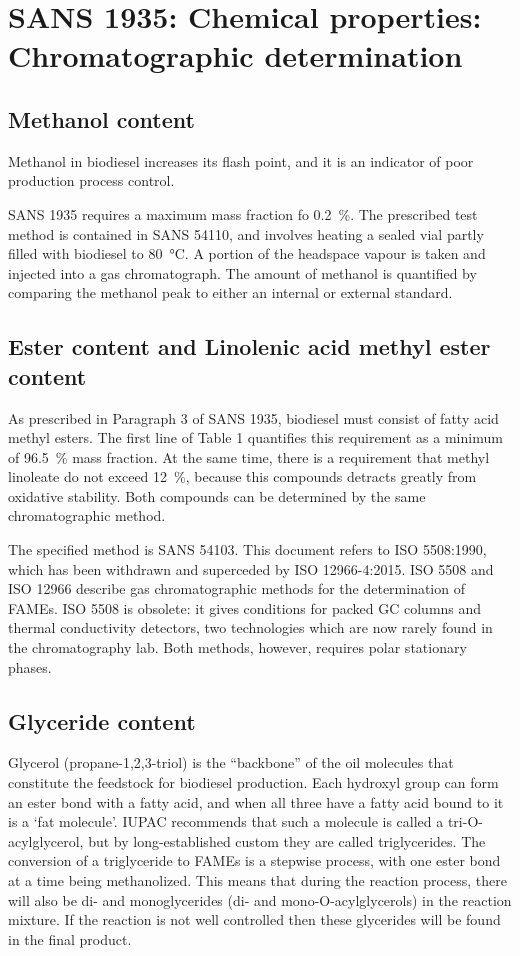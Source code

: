 \section{SANS 1935: Chemical properties: Chromatographic determination}
\label{sec:ChromDet}

\subsection{Methanol content}

Methanol in biodiesel increases its flash point, and it is an indicator of poor
production process control.

SANS 1935 requires a maximum mass fraction fo \SI{0.2}{\percent}. The prescribed
test method is contained in SANS 54110, and involves heating a sealed vial
partly filled with biodiesel to \SI{80}{\celsius}. A portion of the headspace
vapour is taken and injected into a gas chromatograph. The amount of methanol is
quantified by comparing the methanol peak to either an internal or external
standard.

\subsection{Ester content and Linolenic acid methyl ester content}
\label{sec:EsterContent}
As prescribed in Paragraph 3 of SANS 1935, biodiesel must consist of fatty acid
methyl esters. The first line of Table 1 quantifies this requirement as a
minimum of \SI{96.5}{\percent} mass fraction. At the same time, there is a
requirement that methyl linoleate do not exceed \SI{12}{\percent}, because this
compounds detracts greatly from oxidative stability. Both compounds can be
determined by the same chromatographic method.

The specified method is SANS 54103. This document refers to ISO 5508:1990, which
has been withdrawn and superceded by ISO 12966-4:2015. ISO 5508 and ISO 12966
describe gas chromatographic methods for the determination of FAMEs. ISO 5508 is
obsolete: it gives conditions for packed GC columns and thermal conductivity
detectors, two technologies which are now rarely found in the chromatography
lab. Both methods, however, requires polar stationary phases. 

\subsection{Glyceride content}
\label{sec:Glycerides}

Glycerol (propane-1,2,3-triol) is the ``backbone'' of the oil molecules that
constitute the feedstock for biodiesel production. Each hydroxyl group can form
an ester bond with a fatty acid, and when all three have a fatty acid bound to
it is a `fat molecule'. IUPAC recommends that such a molecule is called a
tri-O-acylglycerol\autocite{Nic2009}, but by long-established custom they are
called triglycerides. The conversion of a triglyceride to FAMEs is a stepwise
process, with one ester bond at a time being methanolized. This means that
during the reaction process, there will also be di- and monoglycerides (di- and
mono-O-acylglycerols) in the reaction mixture. If the reaction is not well
controlled then these glycerides will be found in the final product.

